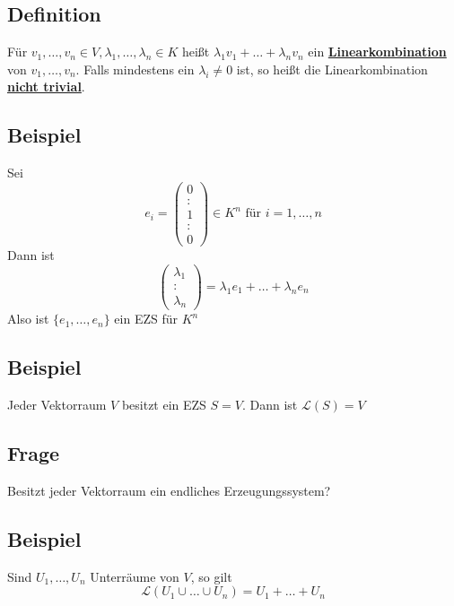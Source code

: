 \subsection{Definition} %
\label{sub:definition}
Für $v_1, \ldots , v_n \in V , \lambda_1, \ldots , \lambda_n \in K$ heißt $\lambda_1 v_1 + \ldots + \lambda_n v_n$ ein \underline{\textbf{Linearkombination}}
von $v_1, \ldots , v_n$. Falls mindestens ein $\lambda_i \not= 0$ ist, so heißt die Linearkombination \underline{\textbf{nicht trivial}}.

\subsection{Beispiel} %
\label{sub:beispiel}
Sei 
\[
	e_i = \begin{pmatrix} 0 \\ : \\ 1 \\ : \\ 0 \end{pmatrix} \in K^n \text{ für } i=1, \ldots , n
\]
Dann ist 
\[
	\begin{pmatrix} \lambda_1 \\ : \\ \lambda_n \end{pmatrix} = \lambda_1 e_1 + \ldots + \lambda_n e_n
\] 
Also ist $ \{ e_1, \ldots , e_n\}$ ein EZS für $K^n$

\subsection{Beispiel} %
\label{sub:beispiel}
Jeder Vektorraum $V$ besitzt ein EZS $S=V$. Dann ist $\mathcal{L} (S) = V$
\subsection{Frage} %
\label{sub:frage}
Besitzt jeder Vektorraum ein endliches Erzeugungssystem?

\subsection{Beispiel} %
\label{sub:beispiel}
Sind $U_1, \ldots  , U_n$ Unterräume von $V$, so gilt
\[
	\mathcal{L} (U_1 \cup \ldots \cup U_n) = U_1 + \ldots  + U_n
\]

